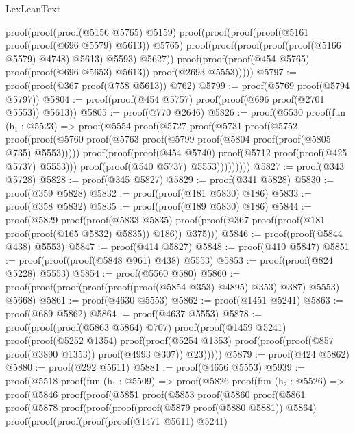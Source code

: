 \begin{lexlean}{LexLeanText}
\begin{coremodule}
      proof(proof(proof(@5156 @5765) @5159)
          proof(proof(proof(proof(@5161 proof(proof(@696 @5579) @5613)) @5765)
                proof(proof(proof(proof(proof(@5166 @5579) @4748) @5613) @5593) @5627))
              proof(proof(proof(@454 @5765) proof(proof(@696 @5653) @5613)) proof(@2693 @5553)))))
@5797 := proof(proof(@367 proof(@758 @5613)) @762)
@5799 := proof(@5769 proof(@5794 @5797))
@5804 := proof(proof(@454 @5757) proof(proof(@696 proof(@2701 @5553)) @5613))
@5805 := proof(@770 @2646)
@5826 := proof(@5530
      proof(fun (h₁ : @5523) =>
        proof(@5554
            proof(@5727
                proof(@5731
                    proof(@5752
                        proof(proof(@5760
                              proof(@5763 proof(@5799 proof(@5804 proof(proof(@5805 @735) @5553)))))
                            proof(proof(proof(@454 @5740)
                                  proof(@5712 proof(proof(@425 @5737) @5553)))
                                proof(proof(@540 @5737) @5553)))))))))
@5827 := proof(@343 @5728)
@5828 := proof(@345 @5827)
@5829 := proof(@341 @5828)
@5830 := proof(@359 @5828)
@5832 := proof(proof(@181 @5830) @186)
@5833 := proof(@358 @5832)
@5835 := proof(proof(@189 @5830) @186)
@5844 := proof(@5829
      proof(proof(@5833 @5835)
          proof(proof(@367 proof(proof(@181 proof(proof(@165 @5832) @5835)) @186)) @375)))
@5846 := proof(proof(@5844 @438) @5553)
@5847 := proof(@414 @5827)
@5848 := proof(@410 @5847)
@5851 := proof(proof(proof(@5848 @961) @438) @5553)
@5853 := proof(proof(@824 @5228) @5553)
@5854 := proof(@5560 @580)
@5860 := proof(proof(proof(proof(proof(proof(@5854 @353) @4895) @353) @387) @5553) @5668)
@5861 := proof(@4630 @5553)
@5862 := proof(@1451 @5241)
@5863 := proof(@689 @5862)
@5864 := proof(@4637 @5553)
@5878 := proof(proof(proof(@5863 @5864) @707)
      proof(proof(@1459 @5241)
          proof(proof(@5252 @1354)
              proof(proof(@5254 @1353)
                  proof(proof(proof(@857 proof(@3890 @1353)) proof(@4993 @307)) @23)))))
@5879 := proof(@424 @5862)
@5880 := proof(@292 @5611)
@5881 := proof(@4656 @5553)
@5939 := proof(@5518
      proof(fun (h₁ : @5509) =>
        proof(@5826
            proof(fun (h₂ : @5526) =>
              proof(@5846
                  proof(proof(@5851
                        proof(@5853
                            proof(@5860
                                proof(@5861
                                    proof(@5878
                                        proof(proof(proof(proof(@5879 proof(@5880 @5881)) @5864)
                                              proof(proof(proof(proof(proof(@1471 @5611) @5241)

\end{coremodule}
\end{lexlean}
